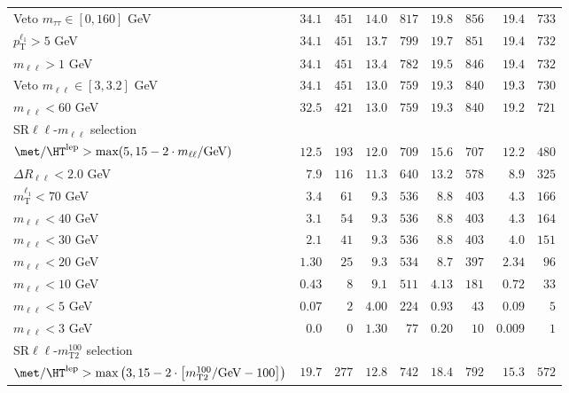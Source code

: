 \begin{table}
\begin{center}
\begin{tabular*}{\textwidth}{@{\extracolsep{\fill}}lrrrrrrrr}
    Veto $m_{\tau\tau} \in [0, 160]$ GeV & $34.1$ & $451$    & $14.0$ & $817$    & $19.8$ & $856$    & $19.4$ & $733$   \\ 
    $p_\text{T}^{\ell_1} > 5$ GeV & $34.1$ & $451$    & $13.7$ & $799$    & $19.7$ & $851$    & $19.4$ & $732$   \\ 
    $m_{\ell\ell} > 1$ GeV & $34.1$ & $451$    & $13.4$ & $782$    & $19.5$ & $846$    & $19.4$ & $732$   \\ 
    Veto $m_{\ell\ell} \in [3, 3.2]$ GeV & $34.1$ & $451$    & $13.0$ & $759$    & $19.3$ & $840$    & $19.3$ & $730$   \\ 
    $m_{\ell\ell} < 60$ GeV & $32.5$ & $421$    & $13.0$ & $759$    & $19.3$ & $840$    & $19.2$ & $721$   \\ 
    
\midrule
SR$\ell\ell$-$m_{\ell\ell}$ selection &  &  &  & \\ 
\midrule
$\met / \HT^\text{lep} > \text{max}(5, 15-2\cdot m_{\ell\ell}/\text{GeV})$ & $12.5$ & $193$    & $12.0$ & $709$    & $15.6$ & $707$    & $12.2$ & $480$   \\ 
    $\Delta R_{\ell\ell} < 2.0$ GeV & $7.9$ & $116$    & $11.3$ & $640$    & $13.2$ & $578$    & $8.9$ & $325$   \\ 
    $m_\text{T}^{\ell_1} < 70$ GeV & $3.4$ & $61$    & $9.3$ & $536$    & $8.8$ & $403$    & $4.3$ & $166$   \\ 
    $m_{\ell\ell} < 40$ GeV & $3.1$ & $54$    & $9.3$ & $536$    & $8.8$ & $403$    & $4.3$ & $164$   \\ 
    $m_{\ell\ell} < 30$ GeV & $2.1$ & $41$    & $9.3$ & $536$    & $8.8$ & $403$    & $4.0$ & $151$   \\ 
    $m_{\ell\ell} < 20$ GeV & $1.30$ & $25$    & $9.3$ & $534$    & $8.7$ & $397$    & $2.34$ & $96$   \\ 
    $m_{\ell\ell} < 10$ GeV & $0.43$ & $8$    & $9.1$ & $511$    & $4.13$ & $181$    & $0.72$ & $33$   \\ 
    $m_{\ell\ell} < 5$ GeV & $0.07$ & $2$    & $4.00$ & $224$    & $0.93$ & $43$    & $0.09$ & $5$   \\ 
    $m_{\ell\ell} < 3$ GeV & $0.0$ & $0$    & $1.30$ & $77$    & $0.20$ & $10$    & $0.009$ & $1$   \\ 
    \midrule
SR$\ell\ell$-$m_\text{T2}^{100}$ selection &  &  &  & \\ 
\midrule
$\met / \HT^\text{lep} > \text{max}\left(3, 15-2\cdot \left[m_\text{T2}^{100}/\text{GeV} - 100\right]\right)$ & $19.7$ & $277$    & $12.8$ & $742$    & $18.4$ & $792$    & $15.3$ & $572$   \\ 

\end{tabular*}
\end{center}
\end{table}
